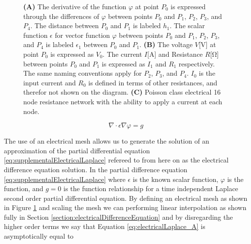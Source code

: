 \begin{figure}
\centering{}
\caption{\textbf{(A)} The derivative of the function $\varphi$ at point $P_0$ is expressed through the differences of $\varphi$ between points $P_0$ and $P_1$, $P_2$, $P_3$, and $P_4$. The distance between $P_0$ and $P_1$ is labeled $h_1$. The scalar function $\epsilon$ for vector function $\varphi$ between points $P_0$ and $P_1$, $P_2$, $P_3$, and $P_4$ is labeled $\epsilon_1$ between $P_0$ and $P_1$. \textbf{(B)}  The voltage $V$[\si{\volt}] at point $P_0$ is expressed as $V_0$. The current $I$[\si{\ampere}] and Resistance $R$[\si{\ohm}] between points $P_0$ and $P_1$ is expressed as $I_1$ and $R_1$ respectively. The same naming conventions apply for $P_2$, $P_3$, and $P_4$. $I_0$ is the input current and $R_0$ is defined in terms of other resistances, and therefor not shown on the diagram. \textbf{(C)} Poisson class electrical 16 node resistance network with the ability to apply a current at each node.}
\label{fig:electrical}
\end{figure}


\begin{equation}\label{eq:electricalLaplace_A}
  \nabla \cdot \epsilon \nabla \varphi = g 
\end{equation}

The use of an electrical mesh allows us to generate the solution of an approximation of the partial differential equation \ref{eq:supplementalElectricalLaplace} refereed to from here on as the electrical difference equation solution. In the partial difference equation \ref{eq:supplementalElectricalLaplace} where $\epsilon$ is the known scalar function, $\varphi$ is the function, and $g=0$ is  the function relationship  for a time independent Laplace second order partial differential equation. By defining an electrical mesh as shown in Figure \ref{fig:electrical} and scaling the mesh we can performing linear interpolation as shown fully in Section \ref{section:electricalDifferenceEquation} and by disregarding the higher order terms we say that Equation \ref{eq:electricalLaplace_A} is asymptotically equal to


